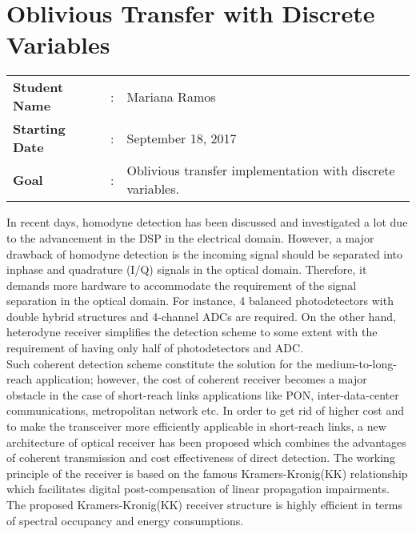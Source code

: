 \clearpage
\section{Oblivious Transfer with Discrete Variables}

\begin{tcolorbox}	
\begin{tabular}{p{2.75cm} p{0.2cm} p{10.5cm}} 	
\textbf{Student Name}  &:& Mariana Ramos\\
\textbf{Starting Date} &:& September 18, 2017\\
\textbf{Goal}          &:& Oblivious transfer implementation with discrete variables.
\end{tabular}
\end{tcolorbox}

In recent days, homodyne detection has been discussed and investigated a lot due to the advancement in the DSP in the electrical domain. However, a major drawback of homodyne detection is the incoming signal should be separated into inphase and quadrature (I/Q) signals in the optical domain. Therefore, it demands more hardware to accommodate the requirement of the signal separation  in the optical domain. For instance, 4 balanced photodetectors with double hybrid structures and 4-channel ADCs are required.
On the other hand, heterodyne receiver simplifies the detection scheme to some extent with the requirement of having only half of photodetectors and ADC.\\
Such coherent detection scheme constitute the solution for the medium-to-long-reach application; however, the cost of coherent receiver becomes a major obstacle in the case of short-reach links applications like PON, inter-data-center communications, metropolitan network etc. In order to get rid of higher cost and to make the transceiver more efficiently applicable in short-reach links, a new architecture of optical receiver has been proposed which combines the advantages of coherent transmission and cost effectiveness of direct detection. The working principle of the receiver is based on the famous Kramers-Kronig(KK) relationship which facilitates digital post-compensation of linear propagation impairments. The proposed Kramers-Kronig(KK) receiver structure is highly efficient in terms of spectral occupancy and energy consumptions.
